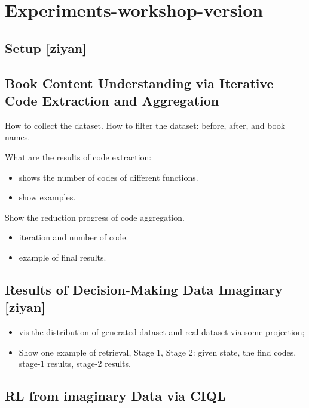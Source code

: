 
\section{Experiments-workshop-version}
\subsection{Setup [ziyan]}

\subsection{Book Content Understanding via Iterative Code Extraction and Aggregation}

How to collect the dataset. How to filter the dataset: before, after, and book names.

What are the results of code extraction: 
\begin{itemize}
    \item shows the number of codes of different functions.
    \item show examples.
\end{itemize}

Show the reduction progress of code aggregation.
\begin{itemize}
    \item iteration and number of code.
    \item example of final results.
\end{itemize}


\subsection{Results of Decision-Making Data Imaginary [ziyan]}

\begin{itemize}
    \item vis the distribution of generated dataset and real dataset via some projection;
    \item Show one example of retrieval, Stage 1, Stage 2: given state, the find codes, stage-1 results, stage-2 results.
\end{itemize}
 
\subsection{RL from imaginary Data via CIQL}


